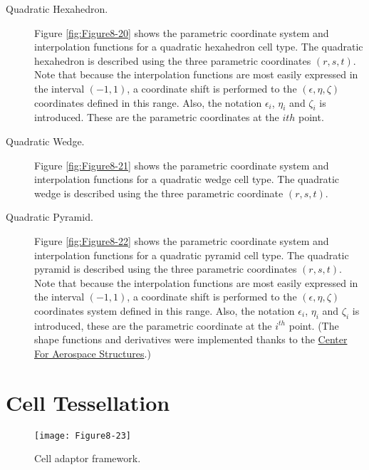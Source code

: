 \begin{description}
    \item[Quadratic Hexahedron.] Figure \ref{fig:Figure8-20} shows the parametric coordinate system and interpolation functions for a quadratic hexahedron cell type. The quadratic hexahedron is described using the three parametric coordinates $(r,s,t)$. Note that because the interpolation functions are most easily expressed in the interval $(-1,1)$, a coordinate shift is performed to the $(\epsilon, \eta, \zeta)$ coordinates defined in this range. Also, the notation $\epsilon_i$, $\eta_i$ and $\zeta_i$ is introduced. These are the parametric coordinates at the $i{th}$ point.

    \item[Quadratic Wedge.] Figure \ref{fig:Figure8-21} shows the parametric coordinate system and interpolation functions for a quadratic wedge cell type. The quadratic wedge is described using the three parametric coordinate $(r,s,t)$.

    \item[Quadratic Pyramid.] Figure \ref{fig:Figure8-22} shows the parametric coordinate system and interpolation functions for a quadratic pyramid cell type. The quadratic pyramid is described using the three parametric coordinates $(r,s,t)$. Note that because the interpolation functions are most easily expressed in the interval $(-1,1)$, a coordinate shift is performed to the $(\epsilon, \eta, \zeta)$ coordinates system defined in this range. Also, the notation $\epsilon_i$, $\eta_i$ and $\zeta_i$ is introduced, these are the parametric coordinate at the $i^{th}$ point. (The shape functions and derivatives were implemented thanks to the \href{https://www.colorado.edu/aerospacestructures/}{Center For Aerospace Structures}.)

\end{description}

\section{Cell Tessellation}

\begin{wrapfigure}{R}{0.4\textwidth}
	\centering
	\texttt{[image: Figure8-23]}
	\caption{Cell adaptor framework.}
	\label{fig:Figure8-23}
\end{wrapfigure}

